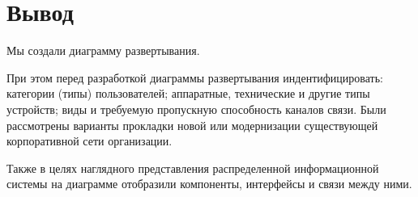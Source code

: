 \clearpage

\section*{\LARGE Вывод}
Мы создали диаграмму развертывания.\par
При этом перед разработкой диаграммы развертывания индентифицировать:
категории (типы) пользователей; аппаратные, технические и другие типы
устройств; виды и требуемую пропускную способность каналов связи.
Были рассмотрены варианты прокладки новой или модернизации
существующей корпоративной сети организации.\par
Также в целях наглядного представления распределенной информационной
системы на диаграмме отобразили компоненты, интерфейсы и
связи между ними.

